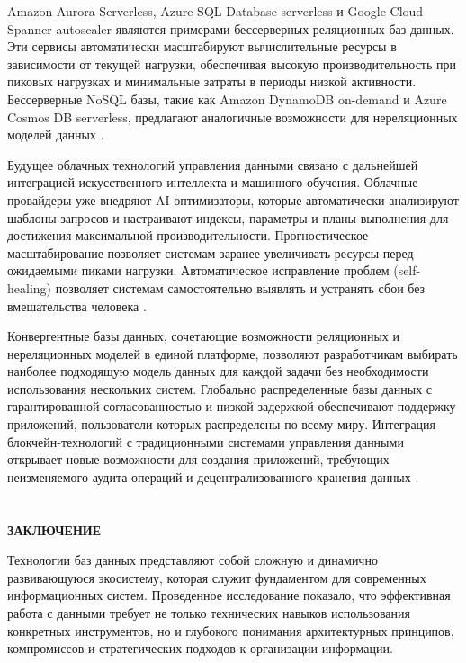 \documentclass{SibFU-docs}
\begin{document}
Amazon Aurora Serverless, Azure SQL Database serverless и Google Cloud Spanner autoscaler являются примерами бессерверных реляционных баз данных. Эти сервисы автоматически масштабируют вычислительные ресурсы в зависимости от текущей нагрузки, обеспечивая высокую производительность при пиковых нагрузках и минимальные затраты в периоды низкой активности. Бессерверные NoSQL базы, такие как Amazon DynamoDB on-demand и Azure Cosmos DB serverless, предлагают аналогичные возможности для нереляционных моделей данных \cite{cockroach}.

Будущее облачных технологий управления данными связано с дальнейшей интеграцией искусственного интеллекта и машинного обучения. Облачные провайдеры уже внедряют AI-оптимизаторы, которые автоматически анализируют шаблоны запросов и настраивают индексы, параметры и планы выполнения для достижения максимальной производительности. Прогностическое масштабирование позволяет системам заранее увеличивать ресурсы перед ожидаемыми пиками нагрузки. Автоматическое исправление проблем (self-healing) позволяет системам самостоятельно выявлять и устранять сбои без вмешательства человека \cite{cockroach}.

Конвергентные базы данных, сочетающие возможности реляционных и нереляционных моделей в единой платформе, позволяют разработчикам выбирать наиболее подходящую модель данных для каждой задачи без необходимости использования нескольких систем. Глобально распределенные базы данных с гарантированной согласованностью и низкой задержкой обеспечивают поддержку приложений, пользователи которых распределены по всему миру. Интеграция блокчейн-технологий с традиционными системами управления данными открывает новые возможности для создания приложений, требующих неизменяемого аудита операций и децентрализованного хранения данных \cite{corbett2012}.

\newpage
\section*{}
\vspace*{-2.5em}
\begin{center}\textbf{ЗАКЛЮЧЕНИЕ}\end{center}
{}

Технологии баз данных представляют собой сложную и динамично развивающуюся экосистему, которая служит фундаментом для современных информационных систем. Проведенное исследование показало, что эффективная работа с данными требует не только технических навыков использования конкретных инструментов, но и глубокого понимания архитектурных принципов, компромиссов и стратегических подходов к организации информации.
\end{document}
